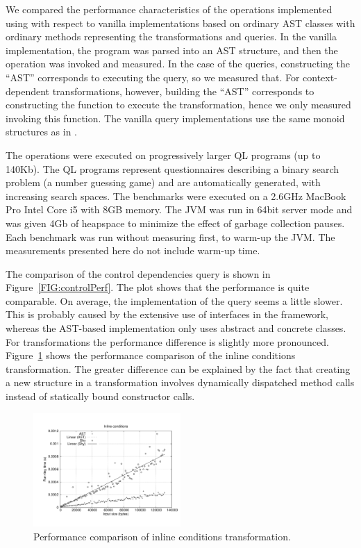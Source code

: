 We compared the performance characteristics of the operations implemented using \name with respect to vanilla implementations based on ordinary AST classes with ordinary methods representing the transformations and queries.
In the vanilla implementation, the program was parsed into an AST structure, and then the operation was invoked and measured.
In the case of the \name queries, constructing the ``AST'' corresponds to executing the query, so we measured that.
For context-dependent transformations, however, building the ``AST'' corresponds to constructing the function to execute the transformation, hence we only measured invoking this function.
The vanilla query implementations use the same monoid structures as in \name.

The operations were executed on progressively larger QL programs (up to 140Kb). The QL programs represent questionnaires describing a binary search problem (a number guessing game) and are automatically generated, with increasing search spaces. The benchmarks were executed on a 2.6GHz MacBook Pro Intel Core i5 with 8GB memory. The JVM was run in 64bit server mode and was given 4Gb of heapspace to minimize the effect of garbage collection pauses. Each benchmark was run without measuring first,  to warm-up the JVM. The measurements presented here do not include warm-up time.

The comparison of the control dependencies query is shown in Figure~\ref{FIG:controlPerf}.
The plot shows that the performance is quite comparable.
On average, the \name implementation of the query seems a little slower.
This is probably caused by the extensive use of interfaces in the \name framework, whereas the AST-based implementation only uses abstract and concrete classes.
For transformations the performance difference is slightly more pronounced.
Figure~\ref{FIG:inlinePerf} shows the performance comparison of the inline conditions transformation.
The greater difference can be explained by the fact that creating a new structure in a \name transformation involves dynamically dispatched method calls instead of statically bound constructor calls.

\begin{figure}[t]
  \nocaptionrule
  \hspace*{-.03\textwidth}
  \includegraphics[width=0.5\textwidth]{plots/inline}
  \caption{Performance comparison of inline conditions transformation.\label{FIG:inlinePerf}}
\end{figure}


